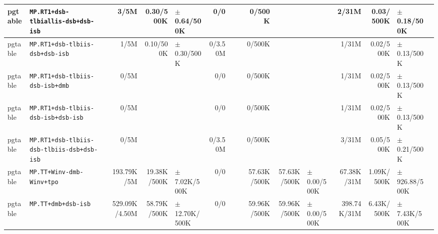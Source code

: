 \begin{tabular}{l l  | r r l | r r l | r r l | r r l l}
         pgtable &                    \verb|MP.RT1+dsb-tlbiallis-dsb+dsb-isb| &           3/5M &             0.30/500K &   $\pm$ 0.64/500K &            0/0 &                       &                 &         0/500K &                       &                   &          2/31M &             0.03/500K &   $\pm$ 0.18/500K & \\ \hline 
         pgtable &                       \verb|MP.RT1+dsb-tlbiis-dsb+dsb-isb| &           1/5M &             0.10/500K &   $\pm$ 0.30/500K &        0/3.50M &                       &                 &         0/500K &                       &                   &          1/31M &             0.02/500K &   $\pm$ 0.13/500K & \\ \hline 
         pgtable &                       \verb|MP.RT1+dsb-tlbiis-dsb-isb+dmb| &           0/5M &                       &                   &            0/0 &                       &                 &         0/500K &                       &                   &          1/31M &             0.02/500K &   $\pm$ 0.13/500K & \\ \hline 
         pgtable &                   \verb|MP.RT1+dsb-tlbiis-dsb-isb+dsb-isb| &           0/5M &                       &                   &            0/0 &                       &                 &         0/500K &                       &                   &          1/31M &             0.02/500K &   $\pm$ 0.13/500K & \\ \hline 
         pgtable &            \verb|MP.RT1+dsb-tlbiis-dsb-tlbiis-dsb+dsb-isb| &           0/5M &                       &                   &        0/3.50M &                       &                 &         0/500K &                       &                   &          3/31M &             0.05/500K &   $\pm$ 0.21/500K & \\ \hline 
         pgtable &                             \verb|MP.TT+Winv-dmb-Winv+tpo| &     193.79K/5M &           19.38K/500K &  $\pm$ 7.02K/500K &            0/0 &                       &                 &    57.63K/500K &           57.63K/500K &   $\pm$ 0.00/500K &     67.38K/31M &            1.09K/500K & $\pm$ 926.88/500K & \\ \hline 
         pgtable &                                   \verb|MP.TT+dmb+dsb-isb| &  529.09K/4.50M &           58.79K/500K & $\pm$ 12.70K/500K &            0/0 &                       &                 &    59.96K/500K &           59.96K/500K &   $\pm$ 0.00/500K &    398.74K/31M &            6.43K/500K &  $\pm$ 7.43K/500K & \\ \hline 

\end{tabular}

